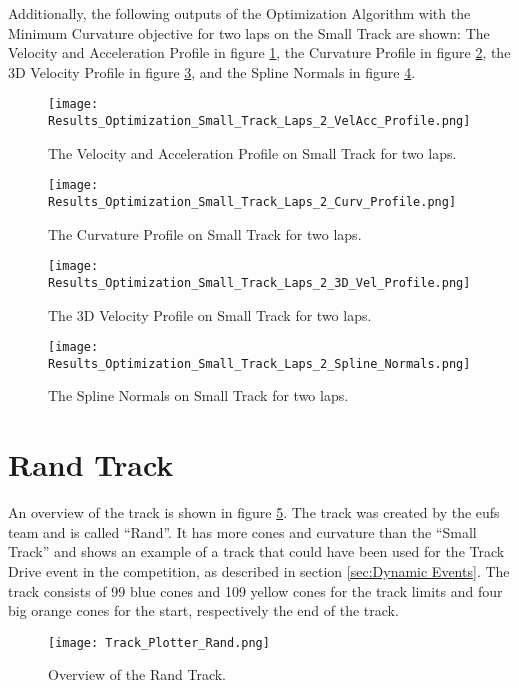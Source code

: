 Additionally, the following outputs of the Optimization Algorithm with the Minimum Curvature objective for two laps on the Small Track are shown: The Velocity and Acceleration Profile in figure \ref{fig:Results Small Track Laps 2 VelAcc Profile}, the Curvature Profile in figure \ref{fig:Results Small Track Laps 2 Curv Profile}, the 3D Velocity Profile in figure \ref{fig:Results Small Track Laps 2 3D Vel Profile}, and the Spline Normals in figure \ref{fig:Results Small Track Laps 2 Spline Normals}.
\begin{figure}[H]
    \centering
    \texttt{[image: Results\_Optimization\_Small\_Track\_Laps\_2\_VelAcc\_Profile.png]}
    \caption{The Velocity and Acceleration Profile on Small Track for two laps.}
    \label{fig:Results Small Track Laps 2 VelAcc Profile}
\end{figure}
\begin{figure}[H]
    \centering
    \texttt{[image: Results\_Optimization\_Small\_Track\_Laps\_2\_Curv\_Profile.png]}
    \caption{The Curvature Profile on Small Track for two laps.}
    \label{fig:Results Small Track Laps 2 Curv Profile}
\end{figure}
\begin{figure}[H]
    \centering
    \texttt{[image: Results\_Optimization\_Small\_Track\_Laps\_2\_3D\_Vel\_Profile.png]}
    \caption{The 3D Velocity Profile on Small Track for two laps.}
    \label{fig:Results Small Track Laps 2 3D Vel Profile}
\end{figure}
\begin{figure}[H]
    \centering
    \texttt{[image: Results\_Optimization\_Small\_Track\_Laps\_2\_Spline\_Normals.png]}
    \caption{The Spline Normals on Small Track for two laps.}
    \label{fig:Results Small Track Laps 2 Spline Normals}
\end{figure}

\section{Rand Track} \label{sec:Results Rand Track}
An overview of the track is shown in figure \ref{fig:Results Rand Initial}. The track was created by the \acrshort{eufs} team and is called ``Rand''. \cite{eufs_sim_gitlab} It has more cones and curvature than the ``Small Track'' and shows an example of a track that could have been used for the Track Drive event in the competition, as described in section \ref{sec:Dynamic Events}. The track consists of 99 blue cones and 109 yellow cones for the track limits and four big orange cones for the start, respectively the end of the track.
\begin{figure}[H]
    \centering
    \texttt{[image: Track\_Plotter\_Rand.png]}
    \caption{Overview of the Rand Track.}
    \label{fig:Results Rand Initial}
\end{figure}


